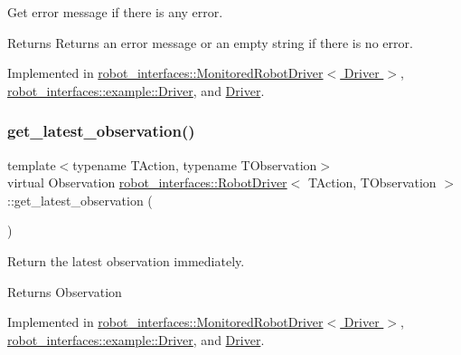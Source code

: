 Get error message if there is any error. 

\begin{DoxyReturn}{Returns}
Returns an error message or an empty string if there is no error. 
\end{DoxyReturn}


Implemented in \hyperlink{classrobot__interfaces_1_1MonitoredRobotDriver_a944425cc7e0845184f33b16405a9e61e}{robot\+\_\+interfaces\+::\+Monitored\+Robot\+Driver$<$ Driver $>$}, \hyperlink{classrobot__interfaces_1_1example_1_1Driver_a8465b912da8f11a6db271f11ff4eced1}{robot\+\_\+interfaces\+::example\+::\+Driver}, and \hyperlink{classDriver_a6fb739b87c892c4102e838508855c0be}{Driver}.

\mbox{\label{classrobot__interfaces_1_1RobotDriver_ad13d4f4fdfe78bdde4fc964f07fa45e2}} 
\subsubsection{\texorpdfstring{get\+\_\+latest\+\_\+observation()}{get\_latest\_observation()}}
{\footnotesize\ttfamily template$<$typename T\+Action, typename T\+Observation$>$ \\
virtual Observation \hyperlink{classrobot__interfaces_1_1RobotDriver}{robot\+\_\+interfaces\+::\+Robot\+Driver}$<$ T\+Action, T\+Observation $>$\+::get\+\_\+latest\+\_\+observation (\begin{DoxyParamCaption}{ }\end{DoxyParamCaption})\hspace{0.3cm}{\ttfamily [pure virtual]}}



Return the latest observation immediately. 

\begin{DoxyReturn}{Returns}
Observation 
\end{DoxyReturn}


Implemented in \hyperlink{classrobot__interfaces_1_1MonitoredRobotDriver_a97774dddcda1038f338d18ef0b572ad8}{robot\+\_\+interfaces\+::\+Monitored\+Robot\+Driver$<$ Driver $>$}, \hyperlink{classrobot__interfaces_1_1example_1_1Driver_a2fa7ee03258e65037ed69d9a8363bfe8}{robot\+\_\+interfaces\+::example\+::\+Driver}, and \hyperlink{classDriver_afb09663997bffc5c694fb5aa8aca243a}{Driver}.

